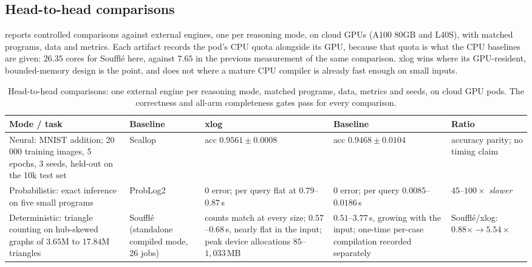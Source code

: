 \subsection{Head-to-head comparisons}\label{sec:h2h}

 reports controlled comparisons against external engines, one per reasoning mode, on cloud GPUs (A100 80GB and L40S), with matched programs, data and metrics. Each artifact records the pod's CPU quota alongside its GPU, because that quota is what the CPU baselines are given: $26.35$ cores for Soufflé here, against $7.65$ in the previous measurement of the same comparison. xlog wins where its GPU-resident, bounded-memory design is the point, and does not where a mature CPU compiler is already fast enough on small inputs.

\begin{table}[htbp]
  \centering
  \caption{Head-to-head comparisons: one external engine per reasoning mode, matched programs, data, metrics and seeds, on cloud GPU pods. The correctness and all-arm completeness gates pass for every comparison.}
  \label{tab:h2h}
  \small
  \begin{tabularx}{\linewidth}{@{}L l L L l@{}}
    \toprule
    \textbf{Mode / task} & \textbf{Baseline} & \textbf{xlog} & \textbf{Baseline} & \textbf{Ratio} \\
    \midrule
    Neural: MNIST addition; 20\,000 training images, 5 epochs, 3 seeds, held-out on the 10k test set
      & Scallop
      & acc $0.9561 \pm 0.0008$
      & acc $0.9468 \pm 0.0104$
      & accuracy parity; no timing claim \\
    \addlinespace
    Probabilistic: exact inference on five small programs
      & ProbLog2
      & $0$ error; per query flat at $0.79$--$0.87$\,s
      & $0$ error; per query $0.0085$--$0.0186$\,s
      & $45$--$100\times$ \emph{slower} \\
    \addlinespace
    Deterministic: triangle counting on hub-skewed graphs of $3.65$M to $17.84$M triangles
      & Soufflé (standalone compiled mode, 26 jobs)
      & counts match at every size; $0.57$--$0.68$\,s, nearly flat in the input; peak device allocations $85$--$1{,}033$\,MB
      & $0.51$--$3.77$\,s, growing with the input; one-time per-case compilation recorded separately
      & Soufflé/xlog: $0.88\times \to \mathbf{5.54\times}$ \\
    \bottomrule
  \end{tabularx}
\end{table}

